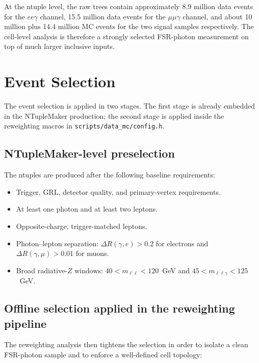\documentclass[11pt,a4paper]{article}
\begin{document}
At the ntuple level, the raw trees contain approximately 8.9 million data events
for the $ee\gamma$ channel, 15.5 million data events for the $\mu\mu\gamma$
channel, and about 10 million plus 14.4 million MC events for the two signal
samples respectively. The cell-level analysis is therefore a strongly selected
FSR-photon measurement on top of much larger inclusive inputs.

\section{Event Selection}

The event selection is applied in two stages. The first stage is already
embedded in the NTupleMaker production; the second stage is applied inside the
reweighting macros in \texttt{scripts/data\_mc/config.h}.

\subsection{NTupleMaker-level preselection}

The ntuples are produced after the following baseline requirements:

\begin{itemize}
  \item Trigger, GRL, detector quality, and primary-vertex requirements.
  \item At least one photon and at least two leptons.
  \item Opposite-charge, trigger-matched leptons.
  \item Photon--lepton separation: $\Delta R(\gamma, e) > 0.2$ for electrons
  and $\Delta R(\gamma, \mu) > 0.01$ for muons.
  \item Broad radiative-$Z$ windows: $40 < m_{\ell\ell} < 120$~GeV and
  $45 < m_{\ell\ell\gamma} < 125$~GeV.
\end{itemize}

\subsection{Offline selection applied in the reweighting pipeline}

The reweighting analysis then tightens the selection in order to isolate a
clean FSR-photon sample and to enforce a well-defined cell topology:
\end{document}
